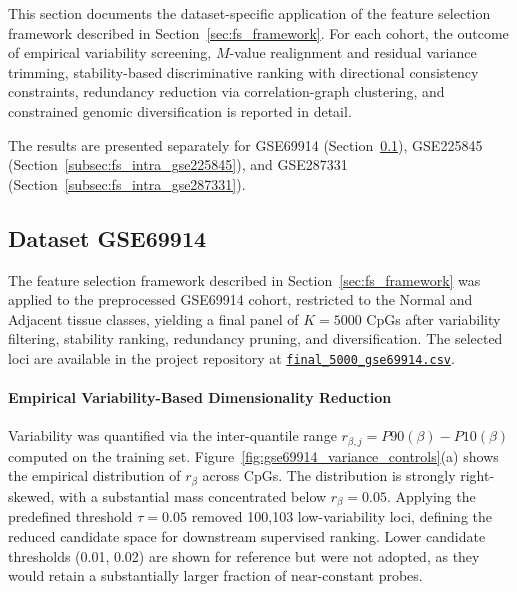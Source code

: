 This section documents the dataset-specific application of the feature selection framework described in Section~\ref{sec:fs_framework}. For each cohort, the outcome of empirical variability screening, $M$-value realignment and residual variance trimming, stability-based discriminative ranking with directional consistency constraints, redundancy reduction via correlation-graph clustering, and constrained genomic diversification is reported in detail. 

The results are presented separately for GSE69914 (Section~\ref{subsec:fs_intra_gse69914}), GSE225845 (Section~\ref{subsec:fs_intra_gse225845}), and GSE287331 (Section~\ref{subsec:fs_intra_gse287331}).

\subsection{Dataset GSE69914}
\label{subsec:fs_intra_gse69914}

The feature selection framework described in Section~\ref{sec:fs_framework} 
was applied to the preprocessed GSE69914 cohort, restricted to the 
Normal and Adjacent tissue classes, yielding a final panel of 
$K=5000$ CpGs after variability filtering, stability ranking, 
redundancy pruning, and diversification. The selected loci are 
available in the project repository at 
\href{https://github.com/elisabettaroviera/THESIS/blob/main/05%20-%20CpG%20list/Final%205000%20CpGs%20per%20Dataset/final_5000_gse69914.csv}
{\texttt{final\_5000\_gse69914.csv}}.

\paragraph{Empirical Variability-Based Dimensionality Reduction}

Variability was quantified via the inter-quantile range 
$r_{\beta,j} = P90(\beta) - P10(\beta)$ computed on the 
training set. Figure~\ref{fig:gse69914_variance_controls}(a) 
shows the empirical distribution of $r_{\beta}$ across CpGs. 
The distribution is strongly right-skewed, with a substantial 
mass concentrated below $r_{\beta}=0.05$. 
Applying the predefined threshold $\tau = 0.05$ removed 
100{,}103 low-variability loci, defining the reduced candidate 
space for downstream supervised ranking. Lower candidate 
thresholds (0.01, 0.02) are shown for reference but were not 
adopted, as they would retain a substantially larger fraction 
of near-constant probes.

